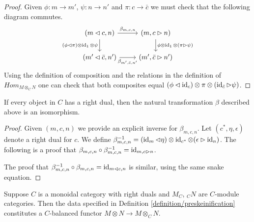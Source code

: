 \begin{proof}
  Given $\phi:m\to m'$, $\psi: n\to n'$ and $\pi:c\to \bar{c}$ we must check
  that the following diagram commutes.
  \[
    \begin{tikzcd}
      {(m\lhd c, n)} & {(m,c\rhd n)} \\
      {(m'\lhd \bar{c}, n')} & {(m',\bar{c}\rhd n')}
      \arrow["{\beta_{m,c,n}}", from=1-1, to=1-2]
      \arrow["{(\phi\lhd\pi)\otimes\id_1\otimes\psi}"', from=1-1, to=2-1]
      \arrow["{\phi\otimes\id_1\otimes(\pi\rhd\psi)}", from=1-2, to=2-2]
      \arrow["{\beta_{m',\bar{c},n'}}"', from=2-1, to=2-2]
    \end{tikzcd}
  \]
  Using the definition of composition and the relations in the definition of
  $Hom_{M\otimes_C N}$ one can check that both composites equal
  $(\phi\lhd\operatorname{id}_c)\otimes\pi\otimes(\operatorname{id}_{\bar{c}}\rhd\psi)$.
\end{proof}


\begin{lemma}\label{beta_invertible}
  If every object in $C$ has a right dual, then the natural transformation
  $\beta$ described above is an isomorphism.
\end{lemma}

\begin{proof}
  Given $(m,c,n)$ we provide an explicit inverse for $\beta_{m,c,n}$. Let
  $(c^*,\eta,\epsilon)$ denote a right dual for $c$. We define
  $\beta^{-1}_{m,c,n}=(\operatorname{id}_m\lhd\eta)\otimes\operatorname{id}_{c^*}\otimes
  (\epsilon\rhd\operatorname{id}_n)$. The following is a proof that
  $\beta_{m,c,n}\circ\beta_{m,c,n}^{-1}=\operatorname{id}_{m,c\rhd n}$.
  \begin{center}\end{center}

  The proof that $\beta_{m,c,n}^{-1}\circ\beta_{m,c,n}=\operatorname{id}_{m\lhd c,n}$ is
  similar, using the same snake equation.
\end{proof}


\begin{proposition}\label{is_balanced}

\noindent Suppose $C$ is a monoidal category with right duals and $M_C$, $_{C}N$ are
$C$-module categories. Then the data specified in
Definition \ref{definition/preskeinification} constitutes a $C$-balanced
functor $M\otimes N\to M\otimes_C N$.
\end{proposition}

